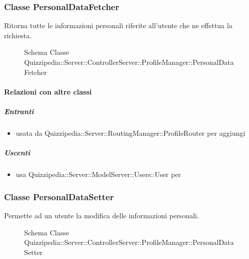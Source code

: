 \subsubsection{Classe PersonalDataFetcher}
Ritorna tutte le informazioni personali riferite all'utente che ne effettua la richiesta.
\begin{figure}[H]
\centering
\noindent{}
\caption[Schema Classe PersonalDataFetcher]{Schema Classe Quizzipedia::Server::ControllerServer::ProfileManager::PersonalDataFetcher}
\end{figure}
\paragraph{Relazioni con altre classi}
\subparagraph{Entranti}
\begin{itemize}
\item usata da Quizzipedia::Server::RoutingManager::ProfileRouter per aggiungi
\end{itemize}
\subparagraph{Uscenti}
\begin{itemize}
\item usa Quizzipedia::Server::ModelServer::Users::User per 
\end{itemize}
\subsubsection{Classe PersonalDataSetter}
Permette ad un utente la modifica delle informazioni personali.
\begin{figure}[H]
\centering
\noindent{}
\caption[Schema Classe PersonalDataSetter]{Schema Classe Quizzipedia::Server::ControllerServer::ProfileManager::PersonalDataSetter}
\end{figure}
